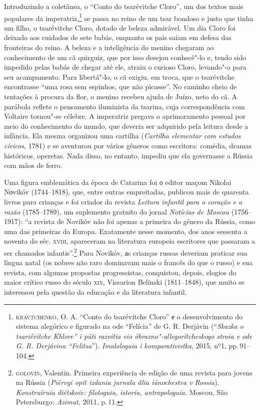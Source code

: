 Introduzindo a coletânea, o ``Conto do tsarévitche
Cloro'', um dos textos mais populares da imperatriz,\footnote{\textsc{kravtchenko},
  O. A. ``Conto do tsarévitche Cloro'' е o desenvolvimento do sistema
  alegórico e figurado na ode ``Felícia'' de G. R. Derjávin
  (``\emph{Skazka o tsariévitche Khlore'' i púti razvitia eio
  óbrazno"-allegorítcheskogo stroia v ode G. R. Derjávina ``Felitsa}'').
  \emph{Imalologuia i komparativistka}, 2015, nº1, pp.\,91--104.} se passa
no reino de um tsar bondoso e justo que tinha um filho, o tsarévitche
Cloro, dotado de beleza admirável. Um dia Cloro foi deixado aos cuidados
de sete babás, enquanto os pais saíam em defesa das fronteiras do reino.
A beleza e a inteligência do menino chegaram ao conhecimento de um cã
quirguiz, que por isso desejou conhecê"-lo e, tendo sido impedido pelas
babás de chegar até ele, atraiu o curioso Cloro, levando"-o para seu
acampamento. Para libertá"-lo, o cã exigiu, em troca, que o tsarévitche
encontrasse ``uma rosa sem espinhos, que não picasse''. No caminho cheio
de tentações à procura da flor, o menino recebeu ajuda de Juízo, neto do
cã. A parábola reflete o pensamento iluminista da tsarina, cuja
correspondência com Voltaire tornou"-se célebre. A imperatriz pregava o
aprimoramento pessoal por meio do conhecimento do mundo, que deveria ser
adquirido pela leitura desde a infância. Ela mesma organizou uma
cartilha (\emph{Cartilha elementar com estudos cívicos}, 1781) e se
aventurou por vários gêneros como escritora: comédia, dramas históricos,
operetas. Nada disso, no entanto, impediu que ela governasse a Rússia
com mãos de ferro.

Uma figura emblemática da época de Catarina foi о editor maçom Nikolai
Nоvikóv (1744--1818), que, entre outras empreitadas, publicou mais de
quarenta livros para crianças e foi criador da revista \emph{Leitura
infantil para o coração e a razão} (1785--1789), um suplemento gratuito
do jornal \emph{Notícias de Moscou} (1756--1917): ``a revista de Novikóv
não foi apenas a primeira do gênero da Rússia, como uma das primeiras da
Europa. Exatamente nesse momento, dos anos sessenta a noventa do séc.
\textsc{xviii}, apareceram na literatura europeia escritores que passaram a ser
chamados infantis''.\footnote{\textsc{golovin}, Valentin. Primeira experiência de
  edição de uma revista para jovens na Rússia (\emph{Piérvyi opit
  izdania jurnala dlia iúnochestva v Rossia}). \emph{Konstruíruia
  diétskoie: filologuia, istoria, antropologuia.} Moscou, São
  Petersburgo: \emph{Azimut,} 2011, p.\,11.} Para Novikóv, аs crianças
russas deveriam praticar sua língua natal (os nobres não raro dominavam
mais o francês do que o russo) e sua revista, com algumas propostas
progressistas, conquistou, depois, elogios do maior crítico
russo do século \textsc{xix}, Vissarion Belínski (1811--1848), que muito se
interessou pela questão da educação e da literatura infantil.

